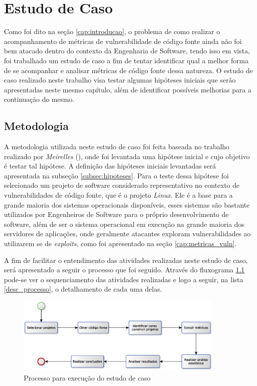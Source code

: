 \chapter{Estudo de Caso} \label{estudodecaso}

Como foi dito na seção \ref{cap:introducao}, o problema de como realizar o
acompanhamento de métricas de vulnerabilidade de código fonte ainda não foi bem
atacado dentro do contexto da Engenharia de Software, tendo isso em vista,
foi trabalhado um estudo de caso a fim de tentar identificar qual a melhor forma
de se acompanhar e analisar métricas de código fonte dessa natureza. O estudo
de caso realizado neste trabalho visa testar algumas hipóteses iniciais que serão apresentadas
neste mesmo capítulo, além de identificar possíveis melhorias para a continuação
do mesmo.

\section{Metodologia}

A metodologia utilizada neste estudo de caso foi feita baseada no trabalho
realizado por \emph{Meirelles} (\citeyear{meirelles2013}), onde foi levantada
uma hipótese inicial e cujo objetivo é testar tal hipótese. A definição das
hipóteses iniciais levantadas será apresentada na subseção \ref{subsec:hipoteses}.
Para o teste dessa hipótese foi selecionado um projeto de software considerado
representativo no contexto de vulnerabilidades de código fonte, que é o projeto
\emph{Linux}. Ele é a base para a grande maioria dos sistemas operacionais
disponíveis, esses sistemas são bastante utilizados por Engenheiros de Software para
o próprio desenvolvimento de software, além de ser o sistema operacional em
execução na grande maioria dos servidores de aplicações, onde geralmente
atacantes exploram vulnerabilidades ao utilizarem se de \textit{exploits}, como
foi apresentado na seção \ref{cap:metricas_vuln}.

A fim de facilitar o entendimento das atividades realizadas neste estudo de
caso, será apresentado a seguir o processo que foi seguido. Através do
fluxograma \ref{fig:processo_estudo_de_caso} pode-se ver o sequenciamento das
atividades realizadas e logo a seguir, na lista \ref{desc_processo}, o
detalhamento de cada uma delas.

\begin{figure}[h]
  \centering
  \includegraphics[width=0.9\textwidth]
      {figuras/estudo_de_caso_processo.eps}
  \caption{Processo para execução do estudo de caso}
  \label{fig:processo_estudo_de_caso}
\end{figure}

